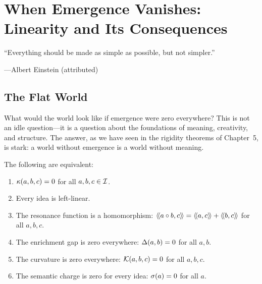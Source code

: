 \chapter{When Emergence Vanishes: Linearity and Its Consequences}
\label{ch:linearity}

\epigraph{``Everything should be made as simple as possible,
but not simpler.''}
{---Albert Einstein (attributed)}


\section{The Flat World}

What would the world look like if emergence were zero everywhere? This is not
an idle question---it is a question about the foundations of meaning, creativity,
and structure. The answer, as we have seen in the rigidity theorems of Chapter~5,
is stark: a world without emergence is a world without meaning.

\begin{theorem}
\label{thm:flat-characterization}
The following are equivalent:
\begin{enumerate}
  \item $\kappa(a, b, c) = 0$ for all $a, b, c \in \mathcal{I}$.
  \item Every idea is left-linear.
  \item The resonance function is a homomorphism: $\langle\!\langle a \circ b, c \rangle\!\rangle = \langle\!\langle a, c \rangle\!\rangle + \langle\!\langle b, c \rangle\!\rangle$ for all $a, b, c$.
  \item The enrichment gap is zero everywhere: $\Delta(a,b) = 0$ for all $a, b$.
  \item The curvature is zero everywhere: $\mathcal{K}(a, b, c) = 0$ for all $a, b, c$.
  \item The semantic charge is zero for every idea: $\sigma(a) = 0$ for all $a$.
\end{enumerate}
\end{theorem}

